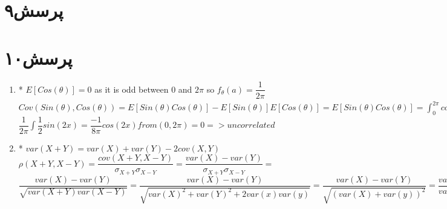 \documentclass[a4paper]{article}
\begin{document}
\pagebreak
\section*{پرسش۹}
\begin{latin}

\end{latin}

\pagebreak
\section*{پرسش۱۰}
\begin{latin}
\begin{enumerate}
\item{}
* $E[Cos(\theta)] = 0$ as it is odd between 0 and $2\pi$
so $f_\theta(a) = \dfrac{1}{2\pi}$\\

$Cov(Sin(\theta), Cos(\theta)) = E[Sin(\theta)Cos(\theta)] - E[Sin(\theta)]E[Cos(\theta)] = E[Sin(\theta)Cos(\theta)] = \int_0^{2\pi}cos(x)sin(x)\dfrac{1}{2\pi}dx=$\\
$ \dfrac{1}{2\pi}\int \dfrac{1}{2}sin(2x)= \dfrac{-1}{8\pi}cos(2x) from(0,2\pi) = 0 => uncorrelated$\\
\item{}
* $var(X+Y) = var(X)+var(Y) - 2cov(X,Y)$\\
$\rho(X+Y,X-Y) = \dfrac{cov(X+Y,X-Y)}{\sigma_{X+Y}\sigma_{X-Y}}=\dfrac{var(X) - var(Y)}{\sigma_{X+Y}\sigma_{X-Y}}=$\\
$\dfrac{var(X) - var(Y)}{\sqrt{var(X+Y)var(X-Y)}}=\dfrac{var(X) - var(Y)}{\sqrt{var(X)^2 + var(Y)^2 + 2var(x)var(y)}} = \dfrac{var(X) - var(Y)}{\sqrt{(var(X)+var(y))^2}} = \dfrac{var(X) - var(Y)}{var(X) + var(Y)}$\\
\end{enumerate}
\end{latin}

\pagebreak
\end{document}
